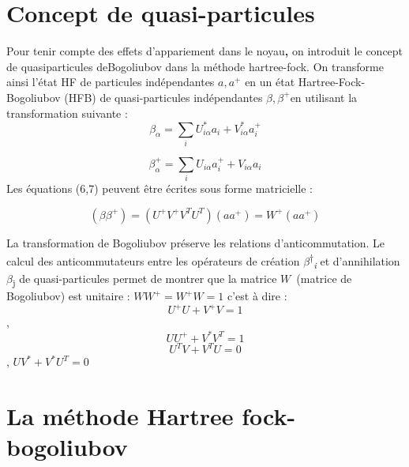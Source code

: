 \section{Concept de quasi-particules}
 Pour tenir compte des effets d'appariement dans le noyau\textbf{,} on introduit le concept de
quasiparticules deBogoliubov dans la méthode hartree-fock. On transforme ainsi l'état HF de particules indépendantes
 ${a,a^+}$ en un état Hartree-Fock-Bogoliubov (HFB) de quasi-particules indépendantes ${\beta ,\beta ^+}$en utilisant la transformation suivante :
 \begin{equation}\beta _{\alpha }=\sum
_iU_{\mathit{i\alpha }}^{\ast }a_i+V_{\mathit{i\alpha }}^{\ast
}a_i^+
\end{equation}

\begin{equation}
\beta _{\alpha }^+=\sum
_iU_{\mathit{i\alpha }}a_i^++V_{\mathit{i\alpha
}}a_i
\end{equation}
Les équations (6,7) peuvent être écrites sous forme matricielle :

 \begin{equation}
(\beta \beta^+  )=(U^+  V^+ V^T U^T ) (a a^+) = W^+ (a a^+ )
\end{equation}


La transformation de Bogoliubov préserve les relations d'anticommutation. Le calcul des anticommutateurs entre les
opérateurs de création\textit{ $\beta $}\textsuperscript{†}\textit{\textsubscript{i}} et d'annihilation \textit{$\beta
$}\textsubscript{j} de quasi-particules permet de montrer que la matrice $W$\ (matrice de Bogoliubov) est unitaire :
$WW^+=W^+W=1$ 
c'est à dire :
 \begin{equation}U^+U+V^+V=1\end{equation} ,
 \begin{equation}UU^++V^{\ast }V^T=1\end{equation}
 \begin{equation}U^TV+V^TU=0\end{equation} ,
$UV^{\ast }+V^{\ast }U^T=0$

\section{La méthode Hartree fock-bogoliubov}

